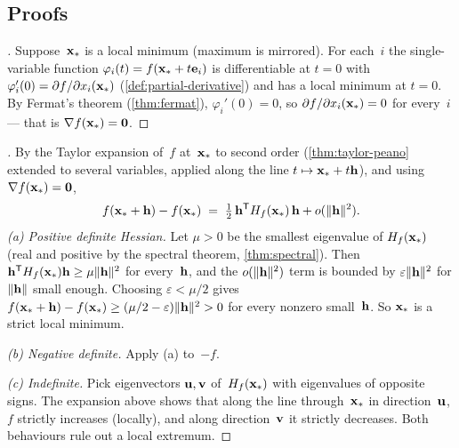\subsection*{Proofs}

\begin{proof}[]
Suppose~$\mathbf{x}_*$ is a local minimum (maximum is mirrored). For
each~$i$ the single-variable function
$\varphi_i(t) = f(\mathbf{x}_* + t\mathbf{e}_i)$ is differentiable at
$t = 0$ with $\varphi_i'(0) = \partial f / \partial x_i (\mathbf{x}_*)$
(\cref{def:partial-derivative}) and has a local minimum at $t = 0$.
By Fermat's theorem (\cref{thm:fermat}), $\varphi_i'(0) = 0$, so
$\partial f / \partial x_i (\mathbf{x}_*) = 0$ for every~$i$ — that is
$\nabla f(\mathbf{x}_*) = \mathbf{0}$.
\end{proof}

\begin{proof}[]
By the Taylor expansion of~$f$ at~$\mathbf{x}_*$ to second order
(\cref{thm:taylor-peano} extended to several variables, applied
along the line $t \mapsto \mathbf{x}_* + t \mathbf{h}$), and using
$\nabla f(\mathbf{x}_*) = \mathbf{0}$,
\[
  f(\mathbf{x}_* + \mathbf{h}) - f(\mathbf{x}_*) \;=\; \tfrac{1}{2}\, \mathbf{h}^{\mathsf{T}} H_f(\mathbf{x}_*)\, \mathbf{h} + o(\|\mathbf{h}\|^2).
\]
\emph{(a) Positive definite Hessian.} Let $\mu > 0$ be the smallest
eigenvalue of $H_f(\mathbf{x}_*)$ (real and positive by the spectral
theorem, \cref{thm:spectral}). Then
$\mathbf{h}^{\mathsf{T}} H_f(\mathbf{x}_*) \mathbf{h} \ge \mu \|\mathbf{h}\|^2$ for
every~$\mathbf{h}$, and the $o(\|\mathbf{h}\|^2)$ term is bounded by
$\varepsilon \|\mathbf{h}\|^2$ for $\|\mathbf{h}\|$ small enough. Choosing
$\varepsilon < \mu/2$ gives
$f(\mathbf{x}_* + \mathbf{h}) - f(\mathbf{x}_*) \ge (\mu/2 - \varepsilon)\|\mathbf{h}\|^2 > 0$
for every nonzero small~$\mathbf{h}$. So $\mathbf{x}_*$ is a strict
local minimum.

\emph{(b) Negative definite.} Apply (a) to~$-f$.

\emph{(c) Indefinite.} Pick eigenvectors $\mathbf{u}, \mathbf{v}$
of~$H_f(\mathbf{x}_*)$ with eigenvalues of opposite signs. The
expansion above shows that along the line through~$\mathbf{x}_*$ in
direction~$\mathbf{u}$, $f$ strictly increases (locally), and along
direction~$\mathbf{v}$ it strictly decreases. Both behaviours rule out
a local extremum.
\end{proof}

